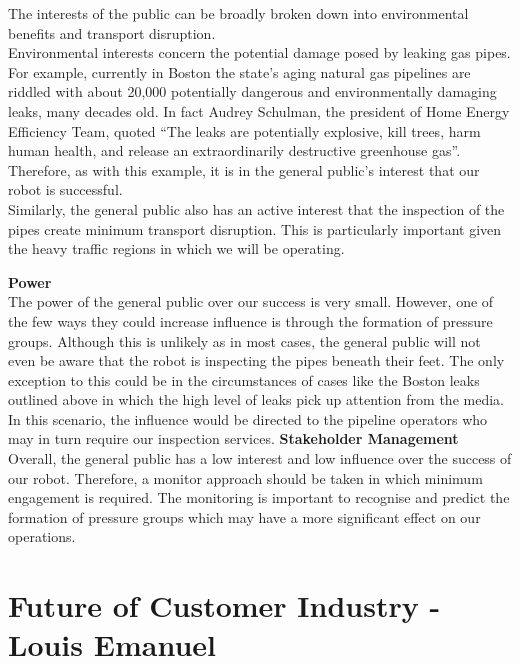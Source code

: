 \documentclass[11pt]{article}		%
\begin{document}
        The interests of the public can be broadly broken down into environmental benefits and transport disruption.\\
	    \hspace*{3ex}Environmental interests concern the potential damage posed by leaking gas pipes. For example, currently in Boston the state’s aging natural gas pipelines are riddled with about 20,000 potentially dangerous and environmentally damaging leaks, many decades old. In fact Audrey Schulman, the president of Home Energy Efficiency Team, quoted  “The leaks are potentially explosive, kill trees, harm human health, and release an extraordinarily destructive greenhouse gas”. Therefore, as with this example, it is in the general public's interest that our robot is successful. \\
        \hspace*{3ex}Similarly, the general public also has an active interest that the inspection of the pipes create minimum transport disruption. This is particularly important given the heavy traffic regions in which we will be operating. 
        
        \textbf{Power}\\
        The power of the general public over our success is very small. However, one of the few ways they could increase influence is through the formation of pressure groups. Although this is unlikely as in most cases, the general public will not even be aware that the robot is inspecting the pipes beneath their feet. The only exception to this could be in the circumstances of cases like the Boston leaks outlined above in which the high level of leaks pick up attention from the media. In this scenario, the influence would be directed to the pipeline operators who may in turn require our inspection services.
        \textbf{Stakeholder Management}\\
        
        Overall, the general public has a low interest and low influence over the success of our robot. Therefore, a monitor approach should be taken in which minimum engagement is required. The monitoring is important to recognise and predict the formation of pressure groups which may have a more significant effect on our operations. 

        
		\section[Future of Customer Industry - EEM]{Future of Customer Industry - Louis Emanuel} %
		
\end{document}
